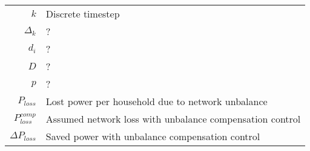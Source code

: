 \begin{longtable}{r l}
  $k$                               & Discrete timestep\\
  $\Delta_k$                        & ?\\
  $d_i$                             & ?\\
  $D$                               & ?\\
  $p$                               & ?\\
  $P_{loss}$                        & Lost power per household due to network unbalance\\
  $P^{comp}_{loss}$                 & Assumed network loss with unbalance compensation control\\
  $\Delta P_{loss}$                 & Saved power with unbalance compensation control\\
\hline
\end{longtable}

